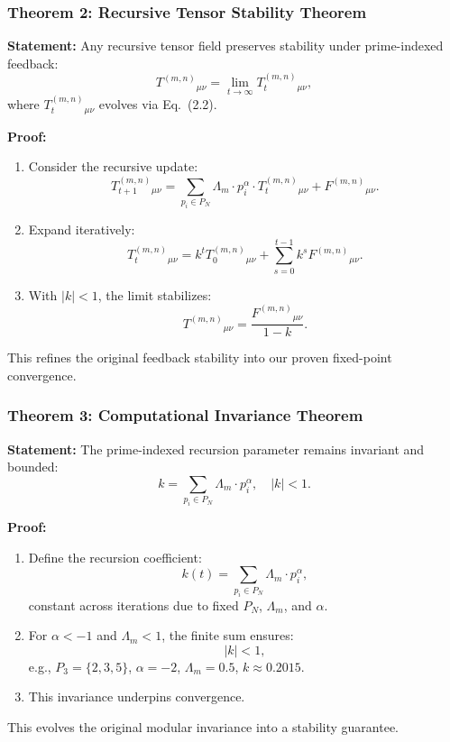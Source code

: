 \documentclass[12pt]{article}
\begin{document}
\subsubsection{Theorem 2: Recursive Tensor Stability Theorem}
\textbf{Statement:} Any recursive tensor field preserves stability under prime-indexed feedback:
\begin{equation}
    T^{(m,n)}{}_{\mu\nu} = \lim_{t \to \infty} T_t^{(m,n)}{}_{\mu\nu},
\end{equation}
where \( T_t^{(m,n)}{}_{\mu\nu} \) evolves via Eq.~(2.2).

\textbf{Proof:}
\begin{enumerate}
    \item Consider the recursive update:
    \[
    T_{t+1}^{(m,n)}{}_{\mu\nu} = \sum_{p_i \in P_N} \Lambda_m \cdot p_i^\alpha \cdot T_t^{(m,n)}{}_{\mu\nu} + F^{(m,n)}{}_{\mu\nu}.
    \]
    \item Expand iteratively:
    \[
    T_t^{(m,n)}{}_{\mu\nu} = k^t T_0^{(m,n)}{}_{\mu\nu} + \sum_{s=0}^{t-1} k^s F^{(m,n)}{}_{\mu\nu}.
    \]
    \item With \( |k| < 1 \), the limit stabilizes:
    \[
    T^{(m,n)}{}_{\mu\nu} = \frac{F^{(m,n)}{}_{\mu\nu}}{1 - k}.
    \]
\end{enumerate}
This refines the original feedback stability into our proven fixed-point convergence.

\subsubsection{Theorem 3: Computational Invariance Theorem}
\textbf{Statement:} The prime-indexed recursion parameter remains invariant and bounded:
\begin{equation}
    k = \sum_{p_i \in P_N} \Lambda_m \cdot p_i^\alpha, \quad |k| < 1.
\end{equation}

\textbf{Proof:}
\begin{enumerate}
    \item Define the recursion coefficient:
    \[
    k(t) = \sum_{p_i \in P_N} \Lambda_m \cdot p_i^\alpha,
    \]
    constant across iterations due to fixed \( P_N \), \( \Lambda_m \), and \( \alpha \).
    \item For \( \alpha < -1 \) and \( \Lambda_m < 1 \), the finite sum ensures:
    \[
    |k| < 1,
    \]
    e.g., \( P_3 = \{2, 3, 5\} \), \( \alpha = -2 \), \( \Lambda_m = 0.5 \), \( k \approx 0.2015 \).
    \item This invariance underpins convergence.
\end{enumerate}
This evolves the original modular invariance into a stability guarantee.
\end{document}
